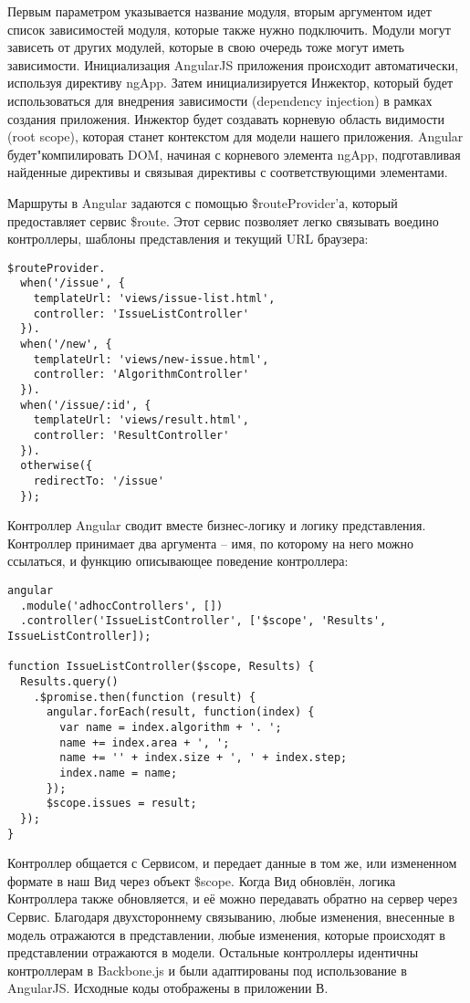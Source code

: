 Первым параметром указывается название модуля, вторым аргументом идет список зависимостей модуля, которые также нужно подключить. Модули могут зависеть от других модулей, которые в свою очередь тоже могут иметь зависимости.
Инициализация AngularJS приложения происходит автоматически, используя директиву ngApp. Затем инициализируется Инжектор, который будет использоваться для внедрения зависимости (dependency injection) в рамках создания приложения. Инжектор будет создавать корневую область видимости (root scope), которая станет контекстом для модели нашего приложения. Angular будет"компилировать DOM, начиная с корневого элемента ngApp, подготавливая найденные директивы и связывая директивы с соответствующими элементами\cite{angular:tutorial}.

Маршруты в Angular задаются с помощью \$routeProvider'а, который предоставляет сервис \$route. Этот сервис позволяет легко связывать воедино контроллеры, шаблоны представления и текущий URL браузера:
\begin{lstlisting}[basicstyle=\normalsize]
$routeProvider.
  when('/issue', {
    templateUrl: 'views/issue-list.html',
    controller: 'IssueListController'
  }).
  when('/new', {
    templateUrl: 'views/new-issue.html',
    controller: 'AlgorithmController'
  }).
  when('/issue/:id', {
    templateUrl: 'views/result.html',
    controller: 'ResultController'
  }).
  otherwise({
    redirectTo: '/issue'
  });
\end{lstlisting}

Контроллер Angular сводит вместе бизнес-логику и логику представления. Контроллер принимает два аргумента – имя, по которому на него можно ссылаться, и функцию описывающее поведение контроллера:
\begin{lstlisting}[basicstyle=\normalsize]
angular
  .module('adhocControllers', [])
  .controller('IssueListController', ['$scope', 'Results', IssueListController]);

function IssueListController($scope, Results) {
  Results.query()
    .$promise.then(function (result) {
      angular.forEach(result, function(index) {
        var name = index.algorithm + '. ';
        name += index.area + ', ';
        name += '' + index.size + ', ' + index.step;
        index.name = name;
      });
      $scope.issues = result;
  });
}
\end{lstlisting}

Контроллер общается с Сервисом, и передает данные в том же, или измененном формате в наш Вид через объект \$scope. Когда Вид обновлён, логика Контроллера также обновляется, и её можно передавать обратно на сервер через Сервис. Благодаря двухстороннему связыванию, любые изменения, внесенные в модель отражаются в представлении, любые изменения, которые происходят в представлении отражаются в модели. Остальные контроллеры идентичны контроллерам в Backbone.js и были адаптированы под использование в AngularJS. Исходные коды отображены в приложении В.


